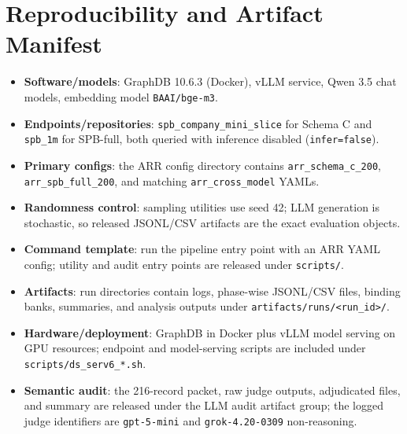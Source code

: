 \documentclass[11pt]{article}
\begin{document}
\section{Reproducibility and Artifact Manifest}
\label{app:repro}
\begin{itemize}
  \item \textbf{Software/models}: GraphDB 10.6.3 (Docker), vLLM service, Qwen 3.5 chat models, embedding model \texttt{BAAI/bge-m3}.
  \item \textbf{Endpoints/repositories}: \texttt{spb\_company\_mini\_slice} for Schema C and \texttt{spb\_1m} for SPB-full, both queried with inference disabled (\texttt{infer=false}).
  \item \textbf{Primary configs}: the ARR config directory contains \texttt{arr\_schema\_c\_200}, \texttt{arr\_spb\_full\_200}, and matching \texttt{arr\_cross\_model} YAMLs.
  \item \textbf{Randomness control}: sampling utilities use seed 42; LLM generation is stochastic, so released JSONL/CSV artifacts are the exact evaluation objects.
  \item \textbf{Command template}: run the pipeline entry point with an ARR YAML config; utility and audit entry points are released under \texttt{scripts/}.
  \item \textbf{Artifacts}: run directories contain logs, phase-wise JSONL/CSV files, binding banks, summaries, and analysis outputs under \texttt{artifacts/runs/<run\_id>/}.
  \item \textbf{Hardware/deployment}: GraphDB in Docker plus vLLM model serving on GPU resources; endpoint and model-serving scripts are included under \texttt{scripts/ds\_serv6\_*.sh}.
  \item \textbf{Semantic audit}: the 216-record packet, raw judge outputs, adjudicated files, and summary are released under the LLM audit artifact group; the logged judge identifiers are \texttt{gpt-5-mini} and \texttt{grok-4.20-0309} non-reasoning.
\end{itemize}
\end{document}
